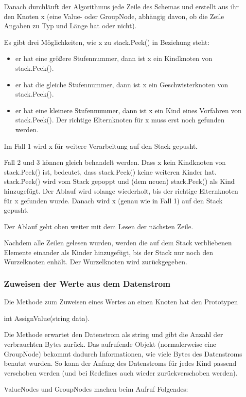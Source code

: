 Danach durchläuft der Algorithmus jede Zeile des Schemas und erstellt aus ihr den Knoten x (eine Value- oder GroupNode, abhängig davon, ob die Zeile Angaben zu Typ und Länge hat oder nicht).


Es gibt drei Möglichkeiten, wie x zu stack.Peek() in Beziehung steht:
\begin{itemize}
\item er hat eine größere Stufennummer, dann ist x ein Kindknoten von stack.Peek().
\item er hat die gleiche Stufennummer, dann ist x ein Geschwisterknoten von stack.Peek().
\item er hat eine kleinere Stufennummer, dann ist x ein Kind eines Vorfahren von stack.Peek(). Der richtige Elternknoten für x muss erst noch gefunden werden.
\end{itemize}
Im Fall 1 wird x für weitere Verarbeitung auf den Stack gepusht.


Fall 2 und 3 können gleich behandelt werden. Dass x kein Kindknoten von stack.Peek() ist, bedeutet, dass stack.Peek() keine weiteren Kinder hat. stack.Peek() wird vom Stack gepoppt und (dem neuen) stack.Peek() als Kind hinzugefügt. Der Ablauf wird solange wiederholt, bis der richtige Elternknoten für x gefunden wurde.
Danach wird x (genau wie in Fall 1) auf den Stack gepusht.

Der Ablauf geht oben weiter mit dem Lesen der nächsten Zeile.


Nachdem alle Zeilen gelesen wurden, werden die auf dem Stack verbliebenen Elemente einander als Kinder hinzugefügt, bis der Stack nur noch den Wurzelknoten enhält. Der Wurzelknoten wird zurückgegeben.


\subsubsection{Zuweisen der Werte aus dem Datenstrom}
Die Methode zum Zuweisen eines Wertes an einen Knoten hat den Prototypen 

int AssignValue(string data).

Die Methode erwartet den Datenstrom als string und gibt die Anzahl der verbrauchten Bytes zurück. Das aufrufende Objekt (normalerweise eine GroupNode) bekommt dadurch Informationen, wie viele Bytes des Datenstroms benutzt wurden. So kann der Anfang des Datenstroms für jedes Kind passend verschoben werden (und bei Redefines auch wieder zurückverschoben werden).

ValueNodes und GroupNodes machen beim Aufruf Folgendes:

